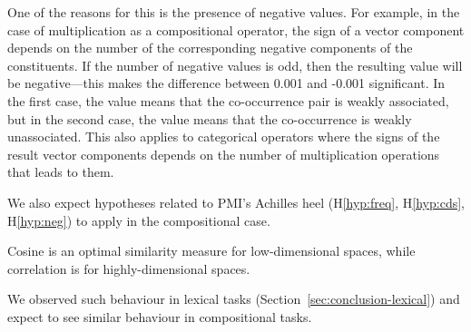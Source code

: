 One of the reasons for this is the presence of negative values. For example, in the case of multiplication as a compositional operator, the sign of a vector component depends on the number of the corresponding negative components of the constituents. If the number of negative values is odd, then the resulting value will be negative---this makes the difference between 0.001 and -0.001 significant. In the first case, the value means that the co-occurrence pair is weakly associated, but in the second case, the value means that the co-occurrence is weakly unassociated. This also applies to categorical operators where the signs of the result vector components depends on the number of multiplication operations that leads to them.

We also expect hypotheses related to PMI's Achilles heel (H\ref{hyp:freq}, H\ref{hyp:cds}, H\ref{hyp:neg}) to apply in the compositional case.

\begin{hyp}
  \label{hyp:similarity}
  Cosine is an optimal similarity measure for low-dimensional spaces, while correlation is for highly-dimensional spaces.
\end{hyp}

We observed such behaviour in lexical tasks (Section~\ref{sec:conclusion-lexical}) and expect to see similar behaviour in compositional tasks.


